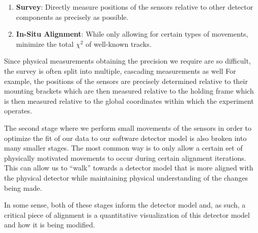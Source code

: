 \begin{enumerate}
	\item \textbf{Survey}: Directly measure positions of the sensors relative to other
	      detector components as precisely as possible.
	\item \textbf{In-Situ Alignment}: While only allowing for certain types of movements,
	      minimize the total $\chi^2$ of well-known tracks.
\end{enumerate}

Since physical measurements obtaining the precision we require are so difficult,
the survey is often split into multiple, cascading measurements as well
For example, the positions of the sensors are precisely determined relative to their
mounting brackets which are then measured relative to the holding frame
which is then measured relative to the global coordinates within which the
experiment operates.

The second stage where we perform small movements of the sensors in order to optimize
the fit of our data to our software detector model is also broken into many smaller
stages. The most common way is to only allow a certain set of physically motivated
movements to occur during certain alignment iterations. This can allow us to ``walk''
towards a detector model that is more aligned with the physical detector while
maintaining physical understanding of the changes being made.

In some sense, both of these stages inform the detector model and, as such,
a critical piece of alignment is a quantitative visualization of this detector
model and how it is being modified.

